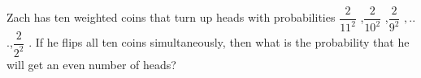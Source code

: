 Zach has ten weighted coins that turn up heads with probabilities $\dfrac{2}{11^2}$ ,$\dfrac{2}{10^2}$ ,$\dfrac{2}{9^2}$ $, . . $.,$\dfrac{2}{2^2}$ . If he flips all ten coins simultaneously, then what is the probability that he will get an even number of heads?
